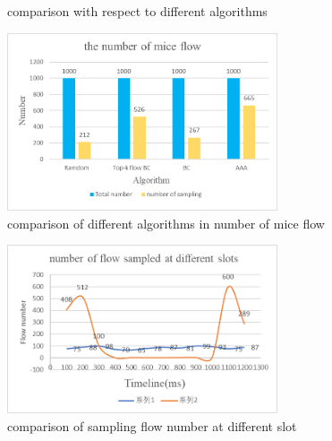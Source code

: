 \documentclass[conference,compsoc]{IEEEtran}
\begin{document}
\begin{figure}[!!!!!!!!!!!!!!hhhhhhhhhht]
\centering
{}
\caption{comparison with respect to different algorithms}
\label{fig_x_cmp}
\end{figure}

\begin{figure}[!hhhhhhhhhht]
\centering
\includegraphics[width=8cm]{images/cmp_mice_flownum.png}
\caption{comparison of different algorithms in number of mice flow}
\label{aaa.png}
\end{figure}

\begin{figure}[!hhhhhhhhhht]
\centering
\includegraphics[width=8cm]{images/num_slot.png}
\caption{comparison of sampling flow number at different slot}
\label{aaa.png}
\end{figure}
\end{document}
